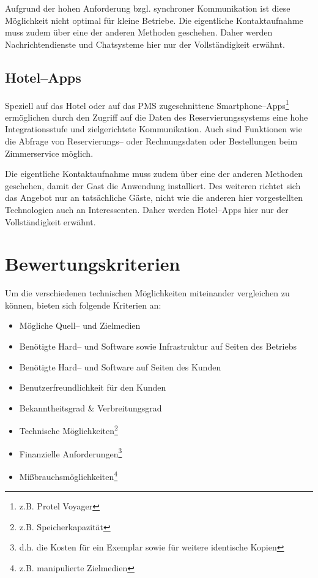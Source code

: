Aufgrund der hohen Anforderung bzgl. synchroner Kommunikation ist diese Möglichkeit nicht optimal für kleine Betriebe. Die eigentliche Kontaktaufnahme muss zudem über eine der anderen Methoden geschehen. Daher werden Nachrichtendienste und Chatsysteme hier nur der Vollständigkeit erwähnt.

\subsection{Hotel--Apps} %
\label{sub:hotel_apps}
Speziell auf das Hotel oder auf das \ac{PMS} zugeschnittene Smartphone–Apps\footnote{z.B. Protel Voyager} ermöglichen durch den Zugriff auf die Daten des Reservierungssystems eine hohe Integrationsstufe und zielgerichtete Kommunikation. Auch sind Funktionen wie die Abfrage von Reservierungs– oder Rechnungsdaten oder Bestellungen beim Zimmerservice möglich.

Die eigentliche Kontaktaufnahme muss zudem über eine der anderen Methoden geschehen, damit der Gast die Anwendung installiert. Des  weiteren richtet sich das Angebot nur an tatsächliche Gäste, nicht wie die anderen hier vorgestellten Technologien auch an Interessenten. Daher werden Hotel–Apps hier nur der Vollständigkeit erwähnt.




\newpage
\section{Bewertungskriterien} %
\label{sec:kriterien}

Um die verschiedenen technischen Möglichkeiten miteinander vergleichen zu können, bieten sich folgende Kriterien an:

\begin{itemize}
\item Mögliche Quell– und Zielmedien
\item Benötigte Hard-- und Software sowie Infrastruktur auf Seiten des Betriebs
\item Benötigte Hard-- und Software auf Seiten des Kunden
\item Benutzerfreundlichkeit für den Kunden
\item Bekanntheitsgrad & Verbreitungsgrad 
\item Technische Möglichkeiten\footnote{z.B. Speicherkapazität}
\item Finanzielle Anforderungen\footnote{d.h. die Kosten für ein Exemplar sowie für weitere identische Kopien}
\item Mißbrauchsmöglichkeiten\footnote{z.B. manipulierte Zielmedien}
\end{itemize}


